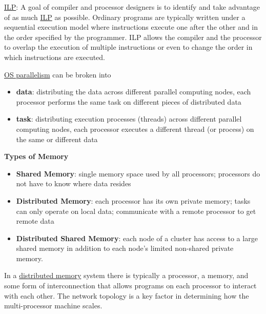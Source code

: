 \documentclass[12pt]{article}
\begin{document}
\underline{ILP}: A goal of compiler and processor designers is to identify and take advantage of as much \underline{ILP} as possible. Ordinary programs are typically written under a sequential execution model where instructions execute one after the other and in the order specified by the programmer. ILP allows the compiler and the processor to overlap the execution of multiple instructions or even to change the order in which instructions are executed.

\underline{OS parallelism} can be broken into 
\begin{itemize}
\item \textbf{data}: distributing the data across different parallel computing nodes, each processor performs the same task on different pieces of distributed data
\item \textbf{task}: distributing execution processes (threads) across different parallel computing nodes, each processor executes a different thread (or process) on the same or different data
\end{itemize}


\vspace*{2em}
\noindent \textbf{Types of Memory}

\begin{itemize}
\item \textbf{Shared Memory}: single memory space used by all processors; processors do not have to know where data resides
\item \textbf{Distributed Memory}: each processor has its own private memory; tasks can only operate on local data; communicate with a remote processor to get remote data
\item \textbf{Distributed Shared Memory}: each node of a cluster has access to a large shared memory in addition to each node's limited non-shared private memory.
\end{itemize}

In a \underline{distributed memory} system there is typically a processor, a memory, and some form of interconnection that allows programs on each processor to interact with each other. %
The network topology is a key factor in determining how the multi-processor machine scales. %
\end{document}
